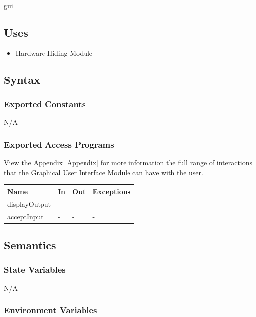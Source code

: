 \documentclass[12pt, titlepage]{article}
\begin{document}
gui
\subsection{Uses}

\begin{itemize}
  \item Hardware-Hiding Module
\end{itemize}

\subsection{Syntax}

\subsubsection{Exported Constants}

N/A

\subsubsection{Exported Access Programs}


View the Appendix \ref{Appendix} for more information the full range of
interactions that the Graphical User Interface Module can have with the user.

\begin{center}
\begin{tabular}{p{4cm} p{4cm} p{4cm} p{2cm}}
\hline
\textbf{Name} & \textbf{In} & \textbf{Out} & \textbf{Exceptions} \\
\hline
displayOutput & - & - & - \\
acceptInput & - & - & - \\
\hline
\end{tabular}
\end{center}

\subsection{Semantics}

\subsubsection{State Variables}

N/A

\subsubsection{Environment Variables}
\end{document}
